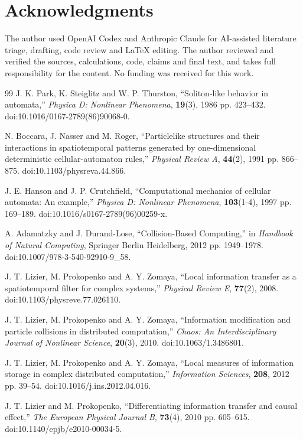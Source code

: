 \documentclass{article}
\begin{document}
\section*{Acknowledgments}
The author used OpenAI Codex and Anthropic Claude for AI-assisted literature triage, drafting, code review and LaTeX editing. The author reviewed and verified the sources, calculations, code, claims and final text, and takes full responsibility for the content. No funding was received for this work.
\begin{thebibliography}{99}
J. K. Park, K. Steiglitz and W. P. Thurston, ``Soliton-like behavior in automata,'' \textit{Physica D: Nonlinear Phenomena}, \textbf{19}(3), 1986 pp. 423--432. doi:10.1016/0167-2789(86)90068-0.

N. Boccara, J. Nasser and M. Roger, ``Particlelike structures and their interactions in spatiotemporal patterns generated by one-dimensional deterministic cellular-automaton rules,'' \textit{Physical Review A}, \textbf{44}(2), 1991 pp. 866--875. doi:10.1103/physreva.44.866.

J. E. Hanson and J. P. Crutchfield, ``Computational mechanics of cellular automata: An example,'' \textit{Physica D: Nonlinear Phenomena}, \textbf{103}(1-4), 1997 pp. 169--189. doi:10.1016/s0167-2789(96)00259-x.

A. Adamatzky and J. Durand-Lose, ``Collision-Based Computing,'' in \textit{Handbook of Natural Computing}, Springer Berlin Heidelberg, 2012 pp. 1949--1978. doi:10.1007/978-3-540-92910-9\_58.

J. T. Lizier, M. Prokopenko and A. Y. Zomaya, ``Local information transfer as a spatiotemporal filter for complex systems,'' \textit{Physical Review E}, \textbf{77}(2), 2008. doi:10.1103/physreve.77.026110.

J. T. Lizier, M. Prokopenko and A. Y. Zomaya, ``Information modification and particle collisions in distributed computation,'' \textit{Chaos: An Interdisciplinary Journal of Nonlinear Science}, \textbf{20}(3), 2010. doi:10.1063/1.3486801.

J. T. Lizier, M. Prokopenko and A. Y. Zomaya, ``Local measures of information storage in complex distributed computation,'' \textit{Information Sciences}, \textbf{208}, 2012 pp. 39--54. doi:10.1016/j.ins.2012.04.016.

J. T. Lizier and M. Prokopenko, ``Differentiating information transfer and causal effect,'' \textit{The European Physical Journal B}, \textbf{73}(4), 2010 pp. 605--615. doi:10.1140/epjb/e2010-00034-5.


\end{thebibliography}
\end{document}
